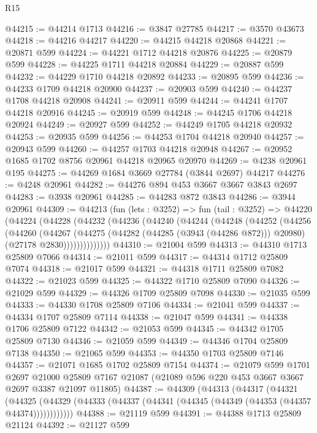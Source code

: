 \begin{lexlean}{R15}
\begin{coremodule}
@44215 := @44214 @1713
@44216 := @3847 @27785
@44217 := @3570 @43673
@44218 := @44216 @44217
@44220 := @44215 @44218 @20868
@44221 := @20871 @599
@44224 := @44221 @1712 @44218 @20876
@44225 := @20879 @599
@44228 := @44225 @1711 @44218 @20884
@44229 := @20887 @599
@44232 := @44229 @1710 @44218 @20892
@44233 := @20895 @599
@44236 := @44233 @1709 @44218 @20900
@44237 := @20903 @599
@44240 := @44237 @1708 @44218 @20908
@44241 := @20911 @599
@44244 := @44241 @1707 @44218 @20916
@44245 := @20919 @599
@44248 := @44245 @1706 @44218 @20924
@44249 := @20927 @599
@44252 := @44249 @1705 @44218 @20932
@44253 := @20935 @599
@44256 := @44253 @1704 @44218 @20940
@44257 := @20943 @599
@44260 := @44257 @1703 @44218 @20948
@44267 := @20952 @1685 @1702 @8756 @20961 @44218 @20965 @20970
@44269 := @4238 @20961 @195
@44275 := @44269 @1684 @3669 @27784 (@3844 @2697) @44217
@44276 := @4248 @20961
@44282 := @44276 @894 @453 @3667 @3667 @3843 @2697
@44283 := @3938 @20961
@44285 := @44283 @872 @3843
@44286 := @3944 @20961
@44309 := @44213
    (fun (lets : @3252) =>
    fun (tail : @3252) =>
    @44220
      (@44224
        (@44228
          (@44232
            (@44236
              (@44240
                (@44244
                  (@44248
                    (@44252
                      (@44256
                        (@44260
                          (@44267
                            (@44275
                              (@44282 (@44285 (@3943 (@44286 @872))) @20980)
                              (@27178 @2830))))))))))))))
@44310 := @21004 @599
@44313 := @44310 @1713 @25809 @7066
@44314 := @21011 @599
@44317 := @44314 @1712 @25809 @7074
@44318 := @21017 @599
@44321 := @44318 @1711 @25809 @7082
@44322 := @21023 @599
@44325 := @44322 @1710 @25809 @7090
@44326 := @21029 @599
@44329 := @44326 @1709 @25809 @7098
@44330 := @21035 @599
@44333 := @44330 @1708 @25809 @7106
@44334 := @21041 @599
@44337 := @44334 @1707 @25809 @7114
@44338 := @21047 @599
@44341 := @44338 @1706 @25809 @7122
@44342 := @21053 @599
@44345 := @44342 @1705 @25809 @7130
@44346 := @21059 @599
@44349 := @44346 @1704 @25809 @7138
@44350 := @21065 @599
@44353 := @44350 @1703 @25809 @7146
@44357 := @21071 @1685 @1702 @25809 @7154
@44374 := @21079
    @599
    @1701
    @2697
    @21000
    @25809
    @7167
    @21087
    (@21089 @596 @220 @453 @3667 @3667 @2697 @3387 @21097 @11805)
@44387 := @44309
    (@44313
      (@44317
        (@44321
          (@44325 (@44329 (@44333 (@44337 (@44341 (@44345 (@44349 (@44353 (@44357 @44374))))))))))))
@44388 := @21119 @599
@44391 := @44388 @1713 @25809 @21124
@44392 := @21127 @599

\end{coremodule}
\end{lexlean}
